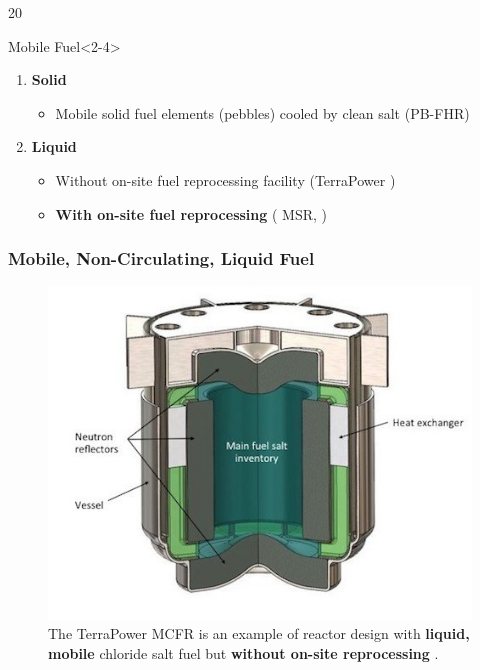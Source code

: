 \begin{frame}
\begin{textblock*}{12cm}
\begin{overlayarea}{\linewidth}{20\baselineskip}
\begin{block}{Mobile Fuel}<2-4>
	\begin{enumerate}
		\item \textbf{Solid}
			\begin{itemize}
				\item<2-> Mobile solid fuel elements (pebbles) cooled by 
				clean salt (PB-FHR)
			\end{itemize}
		\item<3-> \textbf{Liquid}
			\begin{itemize}
				\item<3-> Without on-site fuel reprocessing facility 
				(TerraPower )
				\item<4-> \textbf{With on-site fuel reprocessing} 
				( MSR, )
			\end{itemize}
	\end{enumerate}
\end{block}
\end{overlayarea}
\end{textblock*}
\end{frame}



\begin{frame}
\frametitle{Mobile, Non-Circulating, Liquid Fuel}
\begin{figure}[t]
\vspace*{-0.1in}
\hspace*{-0.35in}
\includegraphics[height=0.6\textwidth]{./images/mcfr-crossection.jpg}
\caption{The TerraPower MCFR is an example of reactor design with 
\textbf{liquid, mobile} chloride salt fuel but \textbf{without on-site 
reprocessing} \cite{doene_southern_2018}.}
\end{figure}   

\end{frame}


